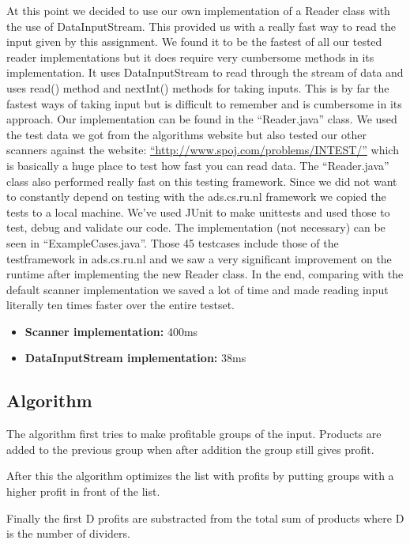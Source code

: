 \documentclass{article}
\begin{document}
At this point we decided to use our own implementation of a Reader class with the use of DataInputStream. This provided us with a really fast way to read the input given by this assignment. We found it to be the fastest of all our tested reader implementations but it does require very cumbersome methods in its implementation. It uses DataInputStream to read through the stream of data and uses read() method and nextInt() methods for taking inputs. This is by far the fastest ways of taking input but is difficult to remember and is cumbersome in its approach. Our implementation can be found in the ``Reader.java'' class. We used the test data we got from the algorithms website but also tested our other scanners against the website: \hyperref[http://www.spoj.com/problems/INTEST/]{``http://www.spoj.com/problems/INTEST/''} which is basically a huge place to test how fast you can read data. The ``Reader.java'' class also performed really fast on this testing framework.
\newline
\newline
Since we did not want to constantly depend on testing with the ads.cs.ru.nl framework we copied the tests to a local machine. We've used JUnit to make unittests and used those to test, debug and validate our code. The implementation (not necessary) can be seen in ``ExampleCases.java''. Those 45 testcases include those of the testframework in ads.cs.ru.nl and we saw a very significant improvement on the runtime after implementing the new Reader class. In the end, comparing with the default scanner implementation we saved a lot of time and made reading input literally ten times faster over the entire testset.
\begin{itemize}
\item \textbf{Scanner implementation:} 400ms
\item \textbf{DataInputStream implementation:} 38ms
\end{itemize}

\subsection{Algorithm}
The algorithm first tries to make profitable groups of the input. Products are added to the previous group when after addition the group still gives profit.

After this the algorithm optimizes the list with profits by putting groups with a higher profit in front of the list.

Finally the first D profits are substracted from the total sum of products where D is the number of dividers.
\end{document}
